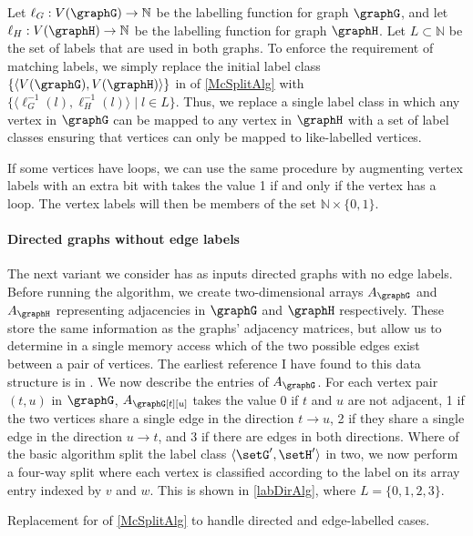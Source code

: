 Let $\ell_G: V(\graphG) \rightarrow \mathbb{N}$ be the labelling function for graph $\graphG$,
and let $\ell_H: V(\graphH) \rightarrow \mathbb{N}$ be the labelling function for graph $\graphH$.
Let $L \subset \mathbb{N}$ be the set of labels that are used in both graphs.
To enforce the requirement of matching labels, we simply
replace the initial label class $\{\langle V(\graphG),V(\graphH) \rangle\}$ in 
of \cref{McSplitAlg}
with $\{\langle \ell_G^{-1}(l), \ell_H^{-1}(l)\rangle \mid l \in L\}$.  Thus, we replace
a single label class in which any vertex in $\graphG$ can be mapped to any
vertex in $\graphH$ with a set of label classes ensuring that vertices can only
be mapped to like-labelled vertices.

If some vertices have loops, we can use the same procedure by augmenting vertex labels with an extra
bit with takes the value 1 if and only if the vertex has a loop.  The vertex labels will then
be members of the set $\mathbb{N} \times \{0,1\}$.

\paragraph{Directed graphs without edge labels} The next variant we consider has as inputs directed
graphs with no edge labels.
Before running the algorithm,
we create two-dimensional arrays $A_\graphG$ and $A_\graphH$ representing adjacencies in
$\graphG$ and $\graphH$ respectively.  These store the same information as the graphs'
adjacency matrices, but allow us to determine in a single memory access which of
the two possible edges exist between a pair of vertices.  The earliest reference I have
found to this data structure is in \cite{DBLP:conf/wea/Lopez-PresaA09}.
We now describe the entries of $A_\graphG$.
For each vertex pair $(t,u)$ in $\graphG$,
$A_\graphG[t][u]$ takes the value 0 if $t$ and $u$ are not
adjacent, 1 if the two vertices share a single edge in the direction $t
\rightarrow u$, 2 if they share a single edge in the direction $u \rightarrow
t$, and 3 if there are edges in both directions. Where
 of the basic algorithm split the
label class $\langle \setG',\setH' \rangle$ in two, we now perform a four-way split
where each vertex is classified according to the label on its array entry indexed by
$v$ and $w$.  This is shown in \cref{labDirAlg}, where
$L=\{0,1,2,3\}$.

\begin{algorithm}[htb]
\DontPrintSemicolon
\nl    {}
    \caption{Replacement for  of \cref{McSplitAlg} to handle directed and edge-labelled cases.}
\label{labDirAlg}
\end{algorithm}

